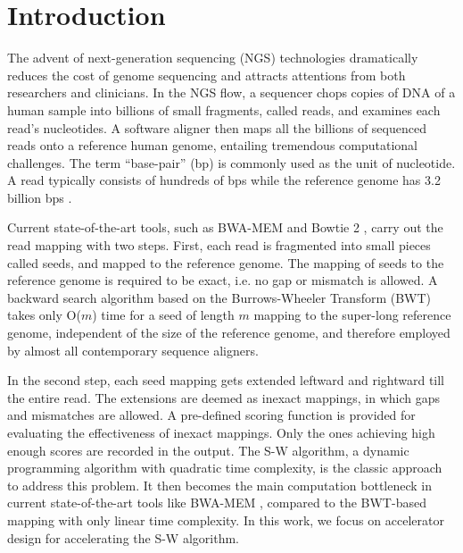 \section{Introduction} 
\label{sec:introduction}

The advent of next-generation sequencing (NGS) technologies dramatically reduces the cost of genome sequencing and attracts attentions from both researchers and clinicians. 
In the NGS flow, a sequencer chops copies of DNA of a human sample into billions of small fragments, called reads, and examines each read's nucleotides. 
A software aligner then maps all the billions of sequenced reads onto a reference human genome, entailing tremendous computational challenges.
The term ``base-pair'' (bp) is commonly used as the unit of nucleotide. %
A read typically consists of hundreds of bps while the reference genome has 3.2 billion bps \cite{Mardis2008}.



Current state-of-the-art tools, such as BWA-MEM \cite{BWA}\cite{BWA-SW}\cite{BWA-MEM} and Bowtie 2 \cite{Bowtie}\cite{Bowtie2}, 
carry out the read mapping with two steps. 
First, each read is fragmented into small pieces called seeds, and mapped to the reference genome. 
The mapping of seeds to the reference genome is required to be exact, i.e. no gap or mismatch is allowed. 
A backward search algorithm based on the Burrows-Wheeler Transform (BWT) \cite{BWT} takes only O($m$) time for a seed of length $m$ mapping to the super-long reference genome, independent of the size of the reference genome, and therefore employed by almost all contemporary sequence aligners.

In the second step, each seed mapping gets extended leftward and rightward till the entire read. 
The extensions are deemed as inexact mappings, in which gaps and mismatches are allowed. A pre-defined scoring function is provided for evaluating the effectiveness of inexact mappings. Only the ones achieving high enough scores are recorded in the output. 
The S-W algorithm, a dynamic programming algorithm with quadratic time complexity, is the classic approach to address this problem. 
It then becomes the main computation bottleneck in current state-of-the-art tools like BWA-MEM \cite{BWA-MEM}, 
compared to the BWT-based mapping with only linear time complexity. 
In this work, we focus on accelerator design for accelerating the S-W algorithm.

